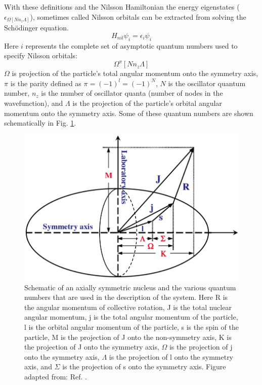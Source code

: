 With these definitions and the Nilsson Hamiltonian the energy eigenstates ($\epsilon_{\Omega[Nn_z\Lambda]}$), sometimes called Nilsson orbitals can be extracted from solving the Sch\"odinger equation.
\begin{equation}
\label{eqn:chp2-schodinger-eqn-nilsson}
H_{nil}\psi_{i}=\epsilon_{i}\psi_{i}
\end{equation}
Here $i$ represents the complete set of asymptotic quantum numbers used to specify Nilsson orbitals:
\begin{equation}
\label{eqn:chp2-nilsson-numbers}
\Omega^{\pi}[Nn_z\Lambda]
\end{equation}
$\Omega$ is projection of the particle's total angular momentum onto the symmetry axis, $\pi$ is the parity defined as $\pi=(-1)^{l}=(-1)^{N}$, $N$ is the oscillator quantum number, $n_z$ is the number of oscillator quanta (number of nodes in the wavefunction), and $\Lambda$ is the projection of the particle's orbital angular momentum onto the symmetry axis. Some of these quantum numbers are shown schematically in Fig. \ref{fig:chp2-nillson-qn}. 

\begin{figure}[hb!]
\centerline{\includegraphics[height=0.22\textheight]{./img/c2/nilsondescr.png}}
	\caption{Schematic of an axially symmetric nucleus and the various quantum numbers that are used in the description of the system. Here R is the angular momentum of collective rotation, J is the total nuclear angular momentum, j is the total angular momentum of the particle, l is the orbital angular momentum of the particle, s is the spin of the particle, M is the projection of J onto the non-symmetry axis, K is the projection of J onto the symmetry axis, $\Omega$ is the projection of j onto the symmetry axis, $\Lambda$ is the projection of l onto the symmetry axis, and $\Sigma$ is the projection of s onto the symmetry axis. Figure adapted from: Ref. \cite{danielDissertation}.\label{fig:chp2-nillson-qn}}
\end{figure}

